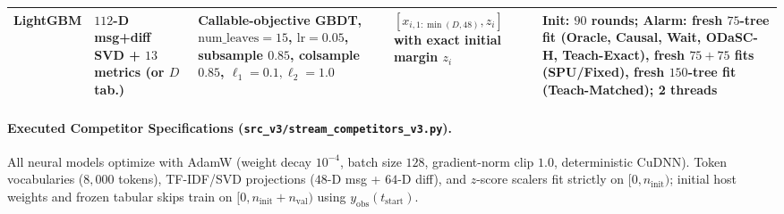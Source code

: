 \documentclass[10pt,a4paper]{article}
\begin{document}
\begin{table}[!htbp]
\begin{tabularx}{\textwidth}{L{2.3cm}L{2.7cm}Y L{2.8cm}L{3.7cm}}
LightGBM \citep{ke2017lightgbm} & $112$-D msg+diff SVD + $13$ metrics (or $D$ tab.) & Callable-objective GBDT, $\text{num\_leaves}=15$, $\text{lr}=0.05$, subsample $0.85$, colsample $0.85$, $\ell_1=0.1, \ell_2=1.0$ & $[x_{i,1:\min(D,48)}, z_i]$ with exact initial margin $z_i$ & Init: $90$ rounds; Alarm: fresh $75$-tree fit (Oracle, Causal, Wait, ODaSC-H, Teach-Exact), fresh $75{+}75$ fits (SPU/Fixed), fresh $150$-tree fit (Teach-Matched); 2 threads \\
\bottomrule
\end{tabularx}
\end{table}

\paragraph{Executed Competitor Specifications (\texttt{src\_v3/stream\_competitors\_v3.py}).}
All neural models optimize with AdamW (weight decay $10^{-4}$, batch size $128$, gradient-norm clip $1.0$, deterministic CuDNN). Token vocabularies ($8{,}000$ tokens), TF-IDF/SVD projections ($48$-D msg + $64$-D diff), and $z$-score scalers fit strictly on $[0, n_{\text{init}})$; initial host weights and frozen tabular skips train on $[0, n_{\text{init}}+n_{\text{val}})$ using $y_{\text{obs}}(t_{\text{start}})$.
\end{document}
